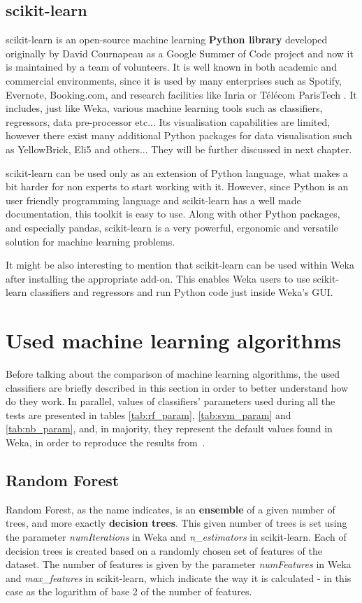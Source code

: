 \subsection{scikit-learn}
scikit-learn is an open-source machine learning \textbf{Python library} developed originally by David Cournapeau as a Google Summer of Code project and now it is maintained by a team of volunteers. It is well known in both academic and commercial environments, since it is used by many enterprises such as Spotify, Evernote, Booking.com, and research facilities like Inria or Télécom ParisTech \cite{noauthor_who_nodate}. It includes, just like Weka, various machine learning tools such as classifiers, regressors, data pre-processor etc... Its visualisation capabilities are limited, however there exist many additional Python packages for data visualisation such as YellowBrick, Eli5 and others... They will be further discussed in next chapter.

scikit-learn can be used only as an extension of Python language, what makes a bit harder for non experts to start working with it. However, since Python is an user friendly programming language and scikit-learn has a well made documentation, this toolkit is easy to use. Along with other Python packages, and especially pandas, scikit-learn is a very powerful, ergonomic and versatile solution for machine learning problems.  

It might be also interesting to mention that scikit-learn can be used within Weka after installing the appropriate add-on. This enables Weka users to use scikit-learn classifiers and regressors and run Python code just inside Weka's GUI.

\section{Used machine learning algorithms}
Before talking about the comparison of machine learning algorithms, the used classifiers are briefly described in this section in order to better understand how do they work. In parallel, values of classifiers' parameters used during all the tests are presented in tables \ref{tab:rf_param}, \ref{tab:svm_param} and \ref{tab:nb_param}, and, in majority, they represent the default values found in Weka, in order to reproduce the results from~\cite{borges_hink_machine_2014-1}.

\subsection{Random Forest}
Random Forest, as the name indicates, is an \textbf{ensemble} of a given number of trees, and more exactly \textbf{decision trees}. This given number of trees is set using the parameter \textit{numIterations} in Weka and \textit{n\_estimators} in scikit-learn. Each of decision trees is created based on a randomly chosen set of features of the dataset. The number of features is given by the parameter \textit{numFeatures} in Weka and \textit{max\_features} in scikit-learn, which indicate the way it is calculated - in this case as the logarithm of base 2 of the number of features. 


